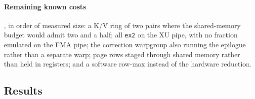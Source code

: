 \paragraph{Remaining known costs}, in order of measured size: a K/V ring of two pairs where the
shared-memory budget would admit two and a half; all \texttt{ex2} on the XU pipe, with no fraction
emulated on the FMA pipe; the correction warpgroup also running the epilogue rather than a separate
warp; page rows staged through shared memory rather than held in registers; and a software row-max
instead of the hardware reduction.

\subsection{Results}
\label{kernelseek:sec:kernels-results}

